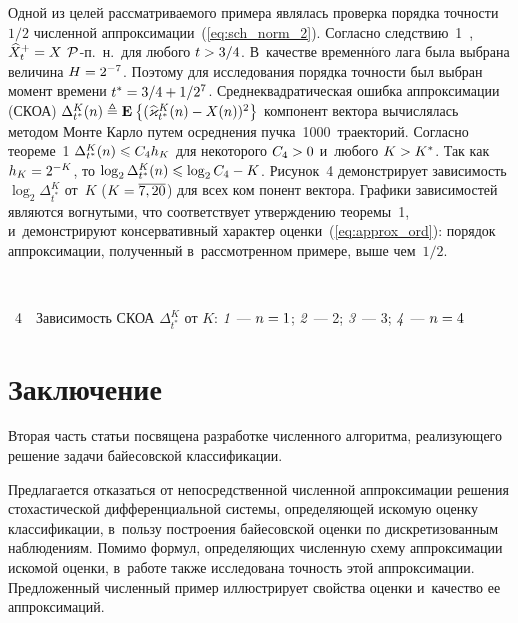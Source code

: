 \begin{multicols}{2}
Одной из целей рассматриваемого примера являлась проверка 
порядка точ\-ности ${1}/{2}$ численной аппроксимации~(\ref{eq:sch_norm_2}). 
Согласно следствию~1~\cite{B_17},  $\widehat{X}^+_t\hm=X$ ${\mathcal P}$-п.~н.\ 
для любого $t \hm> {3}/{4}$. В~качестве временн$\acute{\mbox{о}}$го лага была выбрана 
величина $H\hm=2^{-7}$. Поэтому для исследования порядка точности был выбран 
момент времени $t^*\hm={3}/{4}+{1}/{2^7}$. Среднеквадратическая ошибка 
аппроксимации (СКОА) $\Delta_{t^*}^K(n) \triangleq \mathbf{E}_{  }\left\{ \mathop{(\widehat{\varkappa}^K_{t^*}
(n)-X(n))^2} \right\}$ компонент вектора вычислялась методом Мон\-те Кар\-ло 
путем осреднения пучка~1000~траекторий.
Согласно теореме~1 $\Delta_{t^*}^K(n)\hm \leqslant C_4 h_K$ для некоторого $C_4\hm>0$ 
и~любого $K \hm> K^*$.
Так как $h_K\hm=2^{-K}$, то $\log_2\Delta_{t^*}^K(n) \hm\leqslant \log_2 C_4 \hm- K$. 
Рисунок~4 демонстрирует зависимость $\log_2\Delta_{t^*}^K$
 от~$K$ ($K\hm=\overline{7,20}$) для всех ком понент вектора.
Графики зависимостей являются
 вогнутыми, что соответствует утверждению теоремы~1, 
и~демонстрируют консервативный характер
 оценки~(\ref{eq:approx_ord}): 
порядок аппроксимации, полученный в~рассмотренном примере, выше чем~${1}/{2}$.

   { \begin{center}  %
 \vspace*{18pt}
 \mbox{%
\epsfxsize=78.033mm
}
\end{center}



\noindent
{{\figurename~4}\ \ \small{Зависимость СКОА $\Delta_{t^*}^K$ от $K$:
\textit{1}~--- $n\hm=1$;
\textit{2}~--- 2; \textit{3}~--- 3; \textit{4}~--- $n\hm=4$}}
}


\addtocounter{figure}{1}
 
  



  \section{Заключение}

  Вторая часть статьи посвящена разработке чис\-лен\-но\-го алгоритма, реализующего 
  решение за\-да\-чи байесовской классификации. 
  
  Предлагается отказаться от 
  непосредственной численной ап\-прок\-си\-ма\-ции решения стохастической дифференциальной 
  системы, определяющей искомую оценку классификации, в~пользу по\-стро\-ения 
  байесовской оценки по дискретизованным наблюдениям. Помимо формул, 
  определяющих чис\-лен\-ную схему аппроксимации искомой оценки, в~работе также 
  исследована точность этой аппроксимации. Предложенный численный пример 
  иллюстрирует свойства оценки и~качество ее аппроксимаций.


\end{multicols}
